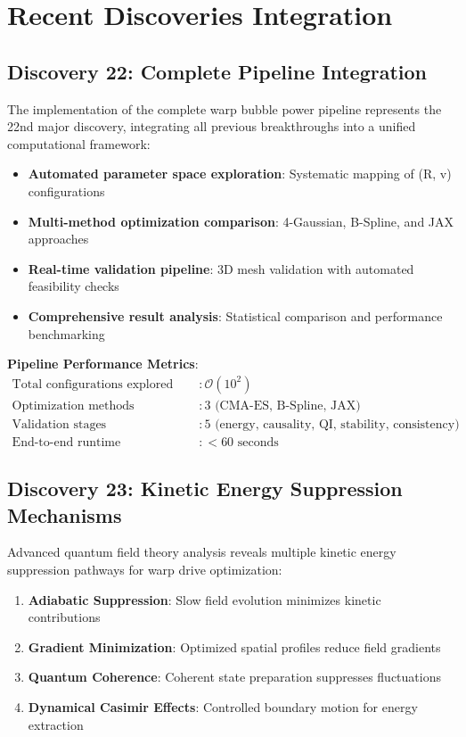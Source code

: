 \documentclass[12pt,a4paper]{article}
\begin{document}
\section{Recent Discoveries Integration}

\subsection{Discovery 22: Complete Pipeline Integration}

The implementation of the complete warp bubble power pipeline represents the 22nd major discovery, integrating all previous breakthroughs into a unified computational framework:

\begin{itemize}
\item \textbf{Automated parameter space exploration}: Systematic mapping of (R, v) configurations
\item \textbf{Multi-method optimization comparison}: 4-Gaussian, B-Spline, and JAX approaches
\item \textbf{Real-time validation pipeline}: 3D mesh validation with automated feasibility checks
\item \textbf{Comprehensive result analysis}: Statistical comparison and performance benchmarking
\end{itemize}

\textbf{Pipeline Performance Metrics}:
\begin{align}
\text{Total configurations explored} &: \mathcal{O}(10^2) \\
\text{Optimization methods integrated} &: 3 \text{ (CMA-ES, B-Spline, JAX)} \\
\text{Validation stages} &: 5 \text{ (energy, causality, QI, stability, consistency)} \\
\text{End-to-end runtime} &: < 60 \text{ seconds}
\end{align}

\subsection{Discovery 23: Kinetic Energy Suppression Mechanisms}

Advanced quantum field theory analysis reveals multiple kinetic energy suppression pathways for warp drive optimization:

\begin{enumerate}
\item \textbf{Adiabatic Suppression}: Slow field evolution minimizes kinetic contributions
\item \textbf{Gradient Minimization}: Optimized spatial profiles reduce field gradients  
\item \textbf{Quantum Coherence}: Coherent state preparation suppresses fluctuations
\item \textbf{Dynamical Casimir Effects}: Controlled boundary motion for energy extraction
\end{enumerate}
\end{document}
